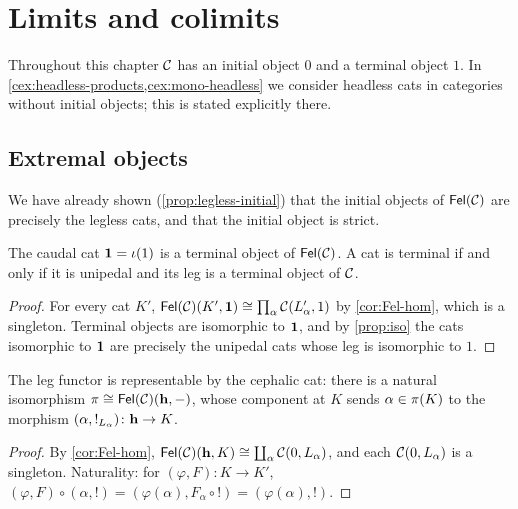 \chapter{Limits and colimits}\label{ch:limits}

\begin{assumption}\label{ass:ch6}
Throughout this chapter $\mathcal{C}$ has an initial object $0$ and a terminal object
$1$. In \cref{cex:headless-products,cex:mono-headless} we consider headless
cats in categories without initial objects; this is stated explicitly there.
\end{assumption}

\section{Extremal objects}\label{sec:extremal}

We have already shown (\cref{prop:legless-initial}) that the initial objects of
$\mathsf{Fel}(\mathcal{C})$ are precisely the legless cats, and that the initial object is
strict.

\begin{proposition}\label{prop:terminal-cat}
The caudal cat $\mathbf{1}=\iota(1)$ is a terminal object of $\mathsf{Fel}(\mathcal{C})$. A cat is
terminal if and only if it is unipedal and its leg is a terminal object of $\mathcal{C}$.
\end{proposition}

\begin{proof}
For every cat $K'$, $\mathsf{Fel}(\mathcal{C})(K',\mathbf{1})\cong\prod_{\alpha}\mathcal{C}(L'_\alpha,1)$
by \cref{cor:Fel-hom}, which is a singleton. Terminal objects are isomorphic
to $\mathbf{1}$, and by \cref{prop:iso} the cats isomorphic to $\mathbf{1}$ are
precisely the unipedal cats whose leg is isomorphic to $1$.
\end{proof}

\begin{lemma}\label{lem:legs-representable}
The leg functor is representable by the cephalic cat: there is a natural
isomorphism $\pi\cong\mathsf{Fel}(\mathcal{C})(\mathbf{h},-)$, whose component at $K$ sends
$\alpha\in\pi(K)$ to the morphism $(\alpha,{!_{L_\alpha}})\colon\mathbf{h}\to K$.
\end{lemma}

\begin{proof}
By \cref{cor:Fel-hom}, $\mathsf{Fel}(\mathcal{C})(\mathbf{h},K)\cong\coprod_{\alpha}\mathcal{C}(0,L_\alpha)$,
and each $\mathcal{C}(0,L_\alpha)$ is a singleton. Naturality: for $(\varphi,F)\colon K\to K'$,
$(\varphi,F)\circ(\alpha,!)=(\varphi(\alpha),F_\alpha\circ{!})=(\varphi(\alpha),!)$.
\end{proof}

